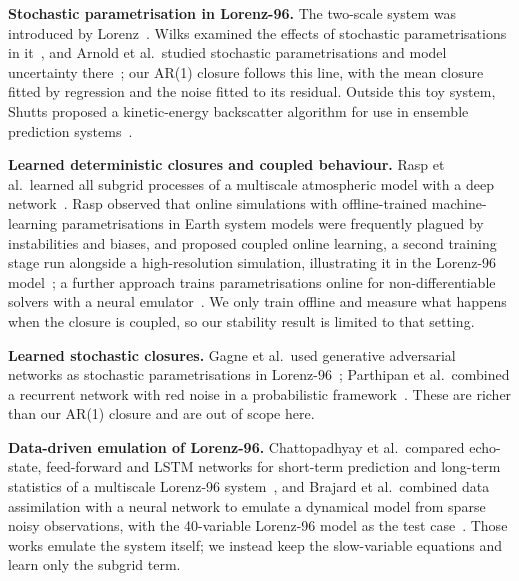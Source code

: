 \textbf{Stochastic parametrisation in Lorenz-96.} The two-scale system was introduced by Lorenz~\cite{lorenz2006predictability}. Wilks examined the effects of stochastic parametrisations in it~\cite{wilks2005effects}, and Arnold et al.\ studied stochastic parametrisations and model uncertainty there~\cite{arnold2013stochastic}; our AR(1) closure follows this line, with the mean closure fitted by regression and the noise fitted to its residual. Outside this toy system, Shutts proposed a kinetic-energy backscatter algorithm for use in ensemble prediction systems~\cite{shutts2005kinetic}.

\textbf{Learned deterministic closures and coupled behaviour.} Rasp et al.\ learned all subgrid processes of a multiscale atmospheric model with a deep network~\cite{rasp2018deep}. Rasp observed that online simulations with offline-trained machine-learning parametrisations in Earth system models were frequently plagued by instabilities and biases, and proposed coupled online learning, a second training stage run alongside a high-resolution simulation, illustrating it in the Lorenz-96 model~\cite{rasp2019coupled}; a further approach trains parametrisations online for non-differentiable solvers with a neural emulator~\cite{frezat2023gradient}. We only train offline and measure what happens when the closure is coupled, so our stability result is limited to that setting.

\textbf{Learned stochastic closures.} Gagne et al.\ used generative adversarial networks as stochastic parametrisations in Lorenz-96~\cite{gagne2019machine}; Parthipan et al.\ combined a recurrent network with red noise in a probabilistic framework~\cite{parthipan2022using}. These are richer than our AR(1) closure and are out of scope here.

\textbf{Data-driven emulation of Lorenz-96.} Chattopadhyay et al.\ compared echo-state, feed-forward and LSTM networks for short-term prediction and long-term statistics of a multiscale Lorenz-96 system~\cite{chattopadhyay2020data}, and Brajard et al.\ combined data assimilation with a neural network to emulate a dynamical model from sparse noisy observations, with the 40-variable Lorenz-96 model as the test case~\cite{brajard2020combining}. Those works emulate the system itself; we instead keep the slow-variable equations and learn only the subgrid term.
